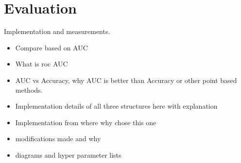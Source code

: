 
\chapter{Evaluation}

Implementation and measurements.

\begin{itemize}
 \item Compare based on AUC
 \item What is roc AUC
 \item AUC vs Accuracy, why AUC is better than Accuracy or other point based methods.
 \item Implementation details of all three structures here with explanation
 \item Implementation from where why chose this one
 \item modifications made and why
 \item diagrams and hyper parameter lists
\end{itemize}

